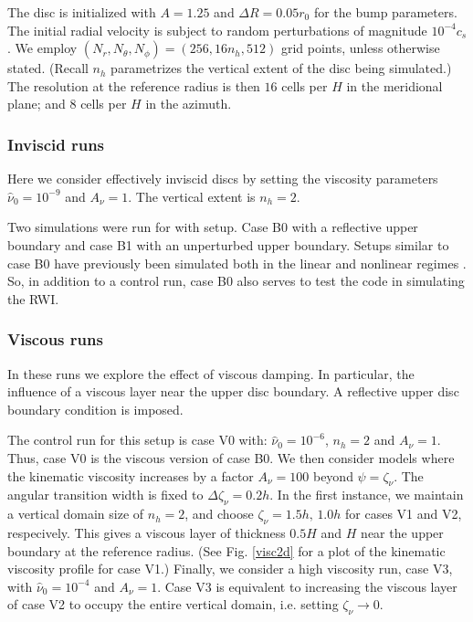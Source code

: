 The disc is initialized with $A=1.25$ and $\Delta R = 0.05r_0$ for the
bump parameters. The initial radial velocity is subject to random
perturbations of magnitude $10^{-4}c_s$. We employ $(N_r, N_\theta,
N_\phi)=(256,16n_h,512)$   
grid points, unless otherwise stated. 
(Recall $n_h$ parametrizes the vertical extent of the disc being
simulated.) The resolution at the reference radius is then $16$ cells
per $H$ in the meridional plane; and $8$ cells per $H$ in the azimuth. 


\subsubsection{Inviscid runs}
Here we consider effectively inviscid discs by setting the viscosity
parameters $\hat{\nu}_0=10^{-9}$ and $A_\nu = 1$. The vertical extent
is $n_h=2$.     

Two simulations were run for with setup. Case B0 with a
reflective upper boundary and case B1 with an unperturbed upper
boundary. Setups similar to case B0 have previously been simulated both in the
linear and nonlinear regimes  \citep{meheut12, lin13}. So, in addition
to a control run, case B0 also serves to test the \pluto code in
simulating the RWI.  

\subsubsection{Viscous runs}
In these runs we explore the effect of viscous damping. In particular,
the influence of a viscous layer near the upper disc boundary. 
A reflective upper disc boundary condition is imposed.  

The control run for this setup is case V0 with: $\hat{\nu}_0=10^{-6}$,
$n_h=2$ and $A_\nu = 1$. Thus, case V0 is the viscous version of case 
B0. We then consider models where the kinematic viscosity increases by
a factor $A_\nu=100$ beyond $\psi=\zeta_\nu$. The angular transition
width is fixed to $\Delta\zeta_\nu=0.2h$. In the first instance, we
maintain a vertical domain size of $n_h=2$, and choose
$\zeta_\nu=1.5h,\,1.0h$ for cases V1 and V2, respecively. This gives a
viscous layer of thickness $0.5H$ and $H$ near the upper boundary at
the reference radius. (See Fig. \ref{visc2d} for a plot of the
kinematic viscosity profile for case V1.) Finally, we consider a high
viscosity run, case V3, with $\hat{\nu}_0=10^{-4}$ and $A_\nu=1$. Case
V3 is equivalent to increasing the viscous layer of case V2 to occupy
the entire vertical domain, i.e. setting $\zeta_\nu\to 0$.
 
